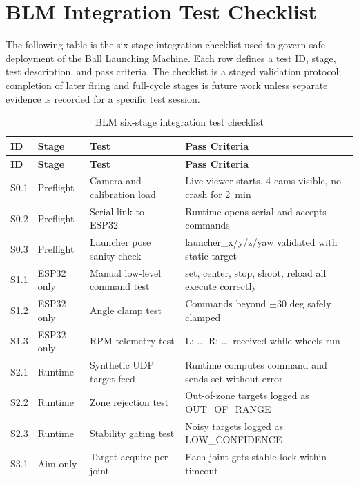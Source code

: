 \cleardoublepage
{}
\chapter{BLM Integration Test Checklist}

The following table is the six-stage integration checklist used to govern safe deployment of the Ball Launching Machine. Each row defines a test ID, stage, test description, and pass criteria. The checklist is a staged validation protocol; completion of later firing and full-cycle stages is future work unless separate evidence is recorded for a specific test session.

{\small
\begin{longtable}{|l|l|p{4.5cm}|p{5.5cm}|}
\caption{BLM six-stage integration test checklist} \label{tab:app_a_checklist} \\
\hline
\textbf{ID} & \textbf{Stage} & \textbf{Test} & \textbf{Pass Criteria} \\
\hline
\endfirsthead
\hline
\textbf{ID} & \textbf{Stage} & \textbf{Test} & \textbf{Pass Criteria} \\
\hline
\endhead
\hline
\endfoot
S0.1 & Preflight & Camera and calibration load & Live viewer starts, 4 cams visible, no crash for 2~min \\
\hline
S0.2 & Preflight & Serial link to ESP32 & Runtime opens serial and accepts commands \\
\hline
S0.3 & Preflight & Launcher pose sanity check & launcher\_x/y/z/yaw validated with static target \\
\hline
S1.1 & ESP32 only & Manual low-level command test & set, center, stop, shoot, reload all execute correctly \\
\hline
S1.2 & ESP32 only & Angle clamp test & Commands beyond $\pm 30$ deg safely clamped \\
\hline
S1.3 & ESP32 only & RPM telemetry test & L: \ldots\ R: \ldots\ received while wheels run \\
\hline
S2.1 & Runtime & Synthetic UDP target feed & Runtime computes command and sends set without error \\
\hline
S2.2 & Runtime & Zone rejection test & Out-of-zone targets logged as OUT\_OF\_RANGE \\
\hline
S2.3 & Runtime & Stability gating test & Noisy targets logged as LOW\_CONFIDENCE \\
\hline
S3.1 & Aim-only & Target acquire per joint & Each joint gets stable lock within timeout \\

\end{longtable}}
